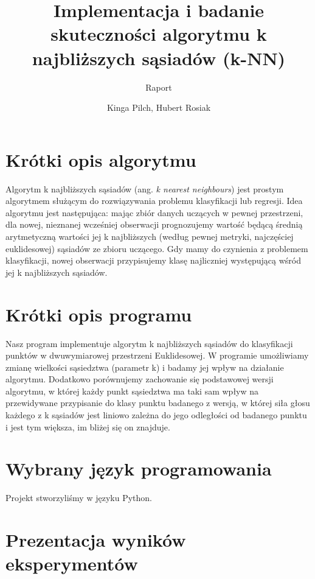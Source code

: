 \documentclass{scrartcl}
\begin{document}
\title{Implementacja i badanie skuteczności algorytmu k najbliższych sąsiadów (k-NN)}

\subtitle{Raport}

\author{Kinga Pilch, Hubert Rosiak}

\maketitle

\section*{Krótki opis algorytmu}

Algorytm k najbliższych sąsiadów (ang. \textit{k nearest neighbours}) jest prostym algorytmem służącym do rozwiązywania problemu klasyfikacji lub regresji. Idea algorytmu jest następująca: mając zbiór danych uczących w pewnej przestrzeni, dla nowej, nieznanej wcześniej obserwacji prognozujemy wartość będącą średnią arytmetyczną wartości jej k najbliższych (według pewnej metryki, najczęściej euklidesowej) sąsiadów ze zbioru uczącego. Gdy mamy do czynienia z problemem klasyfikacji, nowej obserwacji przypisujemy klasę najliczniej występującą wśród jej k najbliższych sąsiadów.

\section*{Krótki opis programu}

Nasz program implementuje algorytm k najbliższych sąsiadów do klasyfikacji punktów w dwuwymiarowej przestrzeni Euklidesowej. W programie umożliwiamy zmianę wielkości sąsiedztwa (parametr k) i badamy jej wpływ na działanie algorytmu. Dodatkowo porównujemy zachowanie się podstawowej wersji algorytmu, w której każdy punkt sąsiedztwa ma taki sam wpływ na przewidywane przypisanie do klasy punktu badanego z wersją, w której siła głosu każdego z k sąsiadów jest liniowo zależna do jego odległości od badanego punktu i jest tym większa, im bliżej się on znajduje.

\section*{Wybrany język programowania}

Projekt stworzyliśmy w języku Python.

\section*{Prezentacja wyników eksperymentów}
\end{document}
